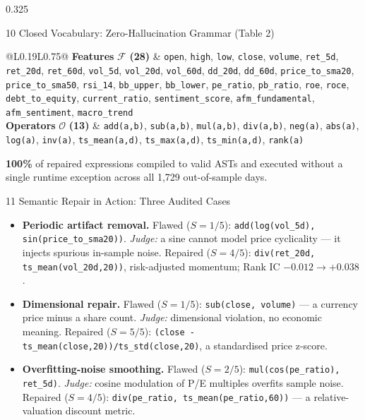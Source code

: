 \documentclass[final]{beamer}
\newcommand{\hl}[1]{\textbf{\color{navy2}#1}}
\newcommand{\gd}[1]{\textbf{\color{good}#1}}
\newcommand{\code}[1]{\texttt{#1}}
\begin{document}
\begin{frame}[t]{}
\begin{columns}[t]
\begin{column}{0.325\textwidth}
\begin{block}{10 \; Closed Vocabulary: Zero-Hallucination Grammar (Table 2)}
{\footnotesize
\setlength{\tabcolsep}{0.22cm}
\renewcommand{\arraystretch}{1.25}
\begin{tabular}{@{}L{0.19\linewidth}L{0.75\linewidth}@{}}
\toprule
\textbf{Features} $\mathcal{F}$ \textbf{(28)} & \code{open}, \code{high}, \code{low}, \code{close}, \code{volume}, \code{ret\_5d}, \code{ret\_20d}, \code{ret\_60d}, \code{vol\_5d}, \code{vol\_20d}, \code{vol\_60d}, \code{dd\_20d}, \code{dd\_60d}, \code{price\_to\_sma20}, \code{price\_to\_sma50}, \code{rsi\_14}, \code{bb\_upper}, \code{bb\_lower}, \code{pe\_ratio}, \code{pb\_ratio}, \code{roe}, \code{roce}, \code{debt\_to\_equity}, \code{current\_ratio}, \code{sentiment\_score}, \code{afm\_fundamental}, \code{afm\_sentiment}, \code{macro\_trend}\\
\midrule
\textbf{Operators} $\mathcal{O}$ \textbf{(13)} & \code{add(a,b)}, \code{sub(a,b)}, \code{mul(a,b)}, \code{div(a,b)}, \code{neg(a)}, \code{abs(a)}, \code{log(a)}, \code{inv(a)}, \code{ts\_mean(a,d)}, \code{ts\_max(a,d)}, \code{ts\_min(a,d)}, \code{rank(a)}\\
\bottomrule
\end{tabular}}
\vskip0.1cm
\gd{100\%} of repaired expressions compiled to valid ASTs and executed without a single runtime exception across all 1,729 out-of-sample days.
\end{block}

\begin{block}{11 \; Semantic Repair in Action: Three Audited Cases}
\begin{itemize}
  \item \hl{Periodic artifact removal.} Flawed ($S{=}1/5$): \code{add(log(vol\_5d), sin(price\_to\_sma20))}. \emph{Judge:} a sine cannot model price cyclicality --- it injects spurious in-sample noise. Repaired ($S{=}4/5$): \code{div(ret\_20d, ts\_mean(vol\_20d,20))}, risk-adjusted momentum; Rank IC $-0.012 \to +0.038$.
  \item \hl{Dimensional repair.} Flawed ($S{=}1/5$): \code{sub(close, volume)} --- a currency price minus a share count. \emph{Judge:} dimensional violation, no economic meaning. Repaired ($S{=}5/5$): \code{(close - ts\_mean(close,20))/ts\_std(close,20)}, a standardised price z-score.
  \item \hl{Overfitting-noise smoothing.} Flawed ($S{=}2/5$): \code{mul(cos(pe\_ratio), ret\_5d)}. \emph{Judge:} cosine modulation of P/E multiples overfits sample noise. Repaired ($S{=}4/5$): \code{div(pe\_ratio, ts\_mean(pe\_ratio,60))} --- a relative-valuation discount metric.
\end{itemize}
\end{block}


\end{column}
\end{columns}
\end{frame}
\end{document}
